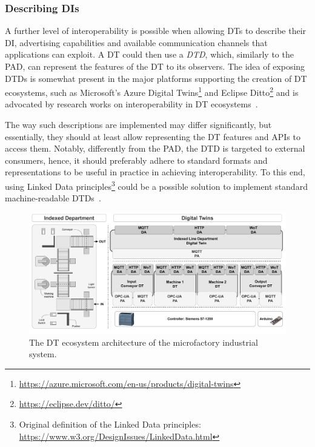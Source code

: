 \subsubsection{Describing \aclp{DI}}

A further level of interoperability is possible when allowing \acp{DT} to describe their \ac{DI}, advertising capabilities and available communication channels that applications can exploit.
%
%
A \ac{DT} could then use a \emph{\ac{DTD}}, which, similarly to the \ac{PAD}, can represent the features of the \ac{DT} to its observers.
%
The idea of exposing \acp{DTD} is somewhat present in the major platforms supporting the creation of \ac{DT} ecosystems, such as 
Microsoft's Azure Digital Twins\footnote{\url{https://azure.microsoft.com/en-us/products/digital-twins}} and Eclipse Ditto\footnote{\url{https://eclipse.dev/ditto/}} and is advocated by research works on interoperability in \ac{DT} ecosystems~\cite{etsi-dt-comm-requirements-2024,giulianelli2024models}.

The way such descriptions are implemented may differ significantly, but essentially, they should at least allow representing the \ac{DT}  features and APIs to access them.
%
Notably, differently from the \ac{PAD}, the \ac{DTD} is targeted to external consumers, hence, it should preferably adhere to standard formats and representations to be useful in practice in achieving interoperability.
%
To this end, using Linked Data principles\footnote{Original definition of the Linked Data principles: \url{https://www.w3.org/DesignIssues/LinkedData.html}} could be a possible solution to implement standard machine-readable \acp{DTD}~\cite{burattini2024models}.

\begin{figure}[t]
    \setlength{\belowcaptionskip}{-13pt}
    \centering
    \includegraphics[width=0.93\linewidth]{figures/dt-interoperability/mf_dt_structure.pdf}
    \caption{The \acl{DT} ecosystem architecture of the microfactory industrial system.}
    \label{fig:mf_dt_ecosystem}
\end{figure}

